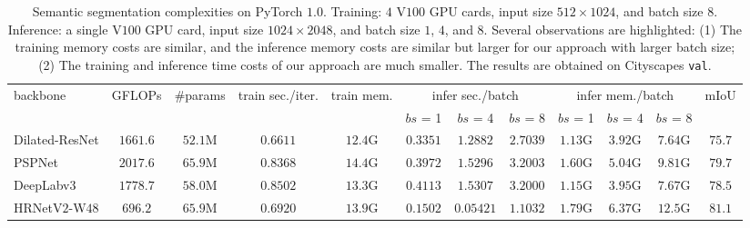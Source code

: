 \documentclass[10pt,journal,compsoc]{IEEEtran}
\begin{document}
\begin{table}[h!]
    \centering\setlength{\tabcolsep}{7pt}
    \scriptsize
    \caption{
    \footnotesize Semantic segmentation complexities
    on PyTorch $1.0$.
    Training: $4$ V$100$ GPU cards, input size $512\times1024$,
    and batch size $8$.
    Inference: a single V$100$ GPU card,
    input size $1024\times2048$,
    and batch size $1$, $4$, and $8$.
    Several observations are highlighted:
    (1) The training memory costs are similar,
    and the inference memory costs are similar
    but larger for our approach with larger batch size;
    (2) The training and inference time costs of our approach
    are much smaller.
    The results are obtained on Cityscapes \texttt{val}.
    }
    \label{tab:pytorch_seg_comparison}
        \begin{tabular}{l|cc|cc|ccc|ccc|c}
        \hline %
		\multirow{2}{*}{backbone} & \multirow{2}{*}{GFLOPs}  & \multirow{2}{*}{\#params} & \multirow{2}{*}{train sec./iter.} &\multirow{2}{*}{train mem.}& \multicolumn{3}{c|}{infer sec./batch} & \multicolumn{3}{c|}{infer mem./batch} & \multirow{2}{*}{mIoU} \\
		\cline{6-11}
		& & & & & $bs$ = 1 & $bs$ = 4 & $bs$ = 8 & $bs$ = 1 & $bs$ = 4 & $bs$ = 8 & \\
        \hline 
    
        
        \hline
        Dilated-ResNet & $1661.6$ & $52.1$M & $0.6611$ & $12.4$G & $0.3351$ & $1.2882$ & $2.7039$ & $1.13$G & $3.92$G & $7.64$G & $75.7$\\
        PSPNet & $2017.6$ & $65.9$M & $0.8368$ & $14.4$G & $0.3972$ & $1.5296$ & $3.2003$ & $1.60$G & $5.04$G & $9.81$G & $79.7$\\
        DeepLabv$3$ & $1778.7$ & $58.0$M & $0.8502$ & $13.3$G & $0.4113$ & $1.5307$ & $3.2000$ & $1.15$G & $3.95$G & $7.67$G & $78.5$ \\
        \hline
        HRNetV$2$-W$48$ & $696.2$  & $65.9$M & $0.6920$ & $13.9$G & $0.1502$ & $0.05421$ & $1.1032$ & $1.79$G & $6.37$G & $12.5$G & $81.1$ \\
        \hline
    \end{tabular}
\end{table}
\end{document}
